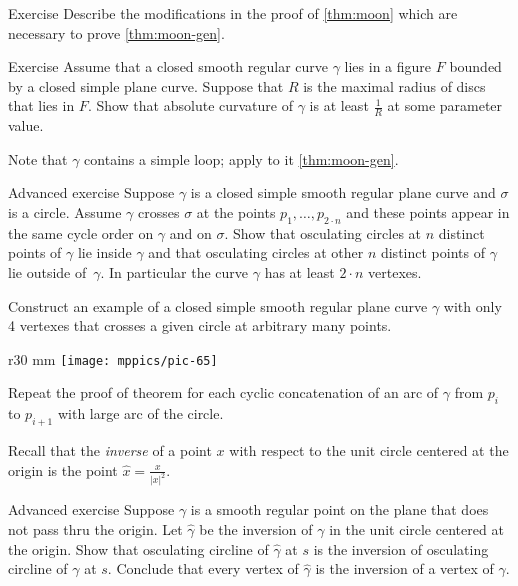 \begin{thm}{Exercise}\label{ex:moon-loop}
Describe the modifications in the proof of \ref{thm:moon} which are necessary to prove \ref{thm:moon-gen}.
\end{thm}

\begin{thm}{Exercise}\label{ex:moon-rad}
Assume that a closed smooth regular curve $\gamma$ lies in a figure $F$ bounded by a closed simple plane curve.
Suppose that $R$ is the maximal radius of discs that lies in $F$.
Show that absolute curvature of $\gamma$ is at least $\tfrac1R$ at some parameter value.
\end{thm}

 Note that $\gamma$ contains a simple loop; apply to it \ref{thm:moon-gen}.


\begin{thm}{Advanced exercise}
Suppose $\gamma$ is a closed simple smooth regular plane curve and $\sigma$ is a circle.
Assume $\gamma$ crosses $\sigma$ at the points $p_1,\dots,p_{2{\cdot} n}$ and these points appear in the same cycle order on $\gamma$ and on $\sigma$.
Show that osculating circles at $n$ distinct points of $\gamma$ lie inside $\gamma$ and that osculating circles at other $n$ distinct points of $\gamma$ lie outside of~$\gamma$.
In particular the curve $\gamma$ has at least $2\cdot n$ vertexes.

Construct an example of a closed simple smooth regular plane curve $\gamma$ with only 4 vertexes that crosses a given circle at arbitrary many points. 
\end{thm}

{

\begin{wrapfigure}{r}{30 mm}
\vskip-8mm
\centering
\texttt{[image: mppics/pic-65]}
\vskip0mm
\end{wrapfigure}

Repeat the proof of theorem for each cyclic concatenation of an arc of $\gamma$ from $p_i$ to $p_{i+1}$ with large arc of the circle. 



Recall that the \emph{inverse} of a point $x$ with respect to the unit circle centered at the origin is the point $\hat x=\tfrac{x}{|x|^2}$.

}


\begin{thm}{Advanced exercise}
Suppose $\gamma$ is a smooth regular point on the plane that does not pass thru the origin.
Let $\hat \gamma$ be the inversion of $\gamma$ in the unit circle centered at the origin.
Show that osculating circline of $\hat\gamma$ at $s$ is the inversion of osculating circline of $\gamma$ at $s$.
Conclude that every vertex of $\hat\gamma$ is the inversion of a vertex of $\gamma$.
\end{thm}

